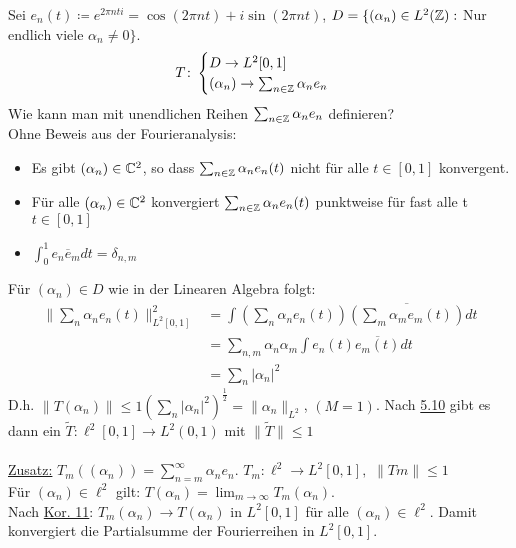 \begin{beispiel}
	Sei $e_{n}(t) \coloneqq e^{2 \pi n t i} = \cos(2 \pi n t) + i \sin(2 \pi n t)$, $D = \{ (\alpha_{n}) \in L^{2}(\mathbb{Z}):$ Nur endlich viele $\alpha_{n} \neq 0 \}$.
	\[ T \colon \begin{cases} D \rightarrow L^{2}[0, 1] \\ (\alpha_{n}) \rightarrow \sum_{n \in \mathbb{Z}} \alpha_{n} e_{n} \end{cases} \]
	Wie kann man mit unendlichen Reihen $\sum_{n \in \mathbb{Z}} \alpha_{n} e_{n}$ definieren? \\
	Ohne Beweis aus der Fourieranalysis:
	\begin{itemize}
		\item Es gibt $(\alpha_{n}) \in \mathbb{C}^{2}$, so dass $\sum_{n \in \mathbb{Z}} \alpha_{n} e_{n}(t)$ nicht für alle $t \in [0, 1]$ konvergent.
		\item Für alle $(\alpha_{n}) \in \mathbb{C}^{2}$ konvergiert $\sum_{n \in \mathbb{Z}} \alpha_{n} e_{n}(t)$ punktweise für fast alle t $t \in [0, 1]$
		\item $\int_{0}^{1} e_{n} \overline e_{m} dt = \delta_{n, m}$
	\end{itemize}
	Für $(\alpha_{n}) \in D$ wie in der Linearen Algebra folgt:
	\begin{align*}
		\| \sum_{n} \alpha_{n} e_{n}(t) \|_{L^{2}[0, 1]}^{2} & = \int (\sum_{n} \alpha_{n} e_{n}(t)) \overline{(\sum_{m} \alpha_{m} e_{m}(t))} dt \\
		& = \sum_{n, m} \alpha_{n} \alpha_{m} \int e_{n}(t) \overline{e_{m}(t)} dt \\
		& = \sum_{n} |\alpha_{n}|^2
	\end{align*}
	D.h. $\| T (\alpha_{n}) \| \leq 1 \left( \sum_{n} |\alpha_{n}|^2 \right)^{\frac{1}{2}} = \| \alpha_{n} \|_{L^{2}}$, $(M = 1)$. Nach \hyperref[prop:5.10]{5.10} gibt es dann ein $\tilde T: \ell^{2}[0, 1] \rightarrow L^{2}(0, 1)$ mit $\| \tilde T \| \leq 1$ \\ \\
	\uline{Zusatz:} $T_{m}((\alpha_{n})) = \sum_{n = m}^{\infty} \alpha_{n} e_{n}$. $T_{m}: \ell^{2} \rightarrow L^{2}[0, 1],$ $\| Tm \| \leq 1$ \\
	Für $(\alpha_{n}) \in \ell^{2}$ gilt: $T (\alpha_{n}) = \lim_{m \rightarrow \infty} T_{m}(\alpha_{n})$. \\
	Nach \hyperref[kor:5.11]{Kor. 11}: $T_{m}(\alpha_{n}) \rightarrow T (\alpha_{n})$ in $L^{2}[0, 1]$ für alle $(\alpha_{n}) \in \ell^{2}$. Damit konvergiert die Partialsumme der Fourierreihen in $L^{2}[0, 1]$.
\end{beispiel}


